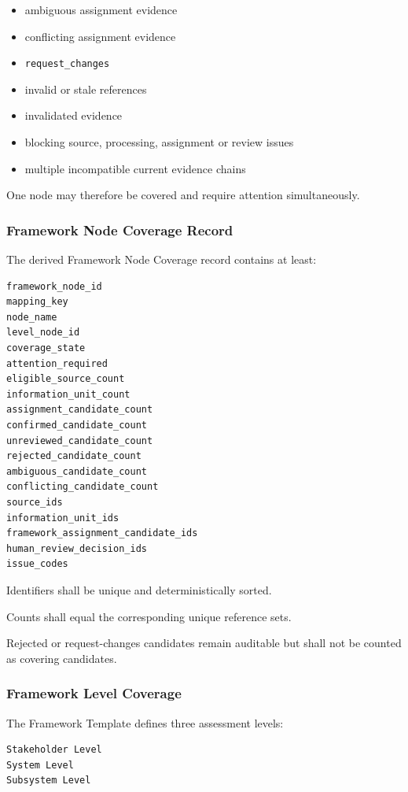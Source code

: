 \begin{itemize}
\tightlist
\item
  ambiguous assignment evidence
\item
  conflicting assignment evidence
\item
  \texttt{request\_changes}
\item
  invalid or stale references
\item
  invalidated evidence
\item
  blocking source, processing, assignment or review issues
\item
  multiple incompatible current evidence chains
\end{itemize}

One node may therefore be covered and require attention simultaneously.

\hypertarget{framework-node-coverage-record}{%
\subsubsection{Framework Node Coverage Record}\label{framework-node-coverage-record}}

The derived Framework Node Coverage record contains at least:

\begin{verbatim}
framework_node_id
mapping_key
node_name
level_node_id
coverage_state
attention_required
eligible_source_count
information_unit_count
assignment_candidate_count
confirmed_candidate_count
unreviewed_candidate_count
rejected_candidate_count
ambiguous_candidate_count
conflicting_candidate_count
source_ids
information_unit_ids
framework_assignment_candidate_ids
human_review_decision_ids
issue_codes
\end{verbatim}

Identifiers shall be unique and deterministically sorted.

Counts shall equal the corresponding unique reference sets.

Rejected or request-changes candidates remain auditable but shall not be counted as covering candidates.

\hypertarget{framework-level-coverage}{%
\subsubsection{Framework Level Coverage}\label{framework-level-coverage}}

The Framework Template defines three assessment levels:

\begin{verbatim}
Stakeholder Level
System Level
Subsystem Level
\end{verbatim}

